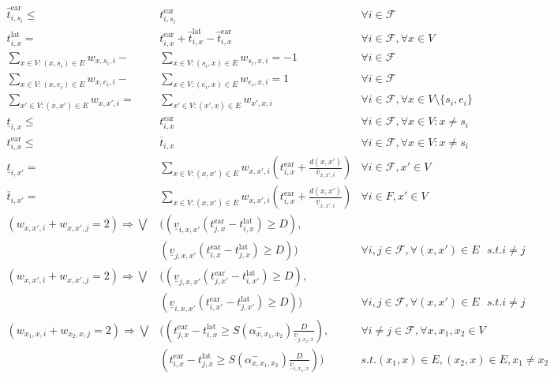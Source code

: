 \documentclass[../thesis.tex]{subfiles}
\begin{document}
\tiny
\begin{align}\label{eq:newModel}
  \hat t^\text{ear}_{i,s_i}\leq&  t^\text{ear}_{i,s_i} & \forall i \in \mathcal F\\
    t^\text{lat}_{i,x}=& t^\text{ear}_{i,x}+\hat t^\text{lat}_{i,x} -\hat t^\text{ear}_{i,x}
    & \forall i\in \mathcal F, \forall x \in V\\
    \sum_{x\in V:(x,s_i)\in E} w_{x,s_i,i} -& \sum_{x\in V:(s_i,x)\in E} w_{s_i,x,i} = -1 & \forall i \in \mathcal{F} \\
    \sum_{x\in V:(x,e_i)\in E} w_{x,e_{i},i} -& \sum_{x\in V:(e_i,x)\in E} w_{e_{i},x,i} = 1 & \forall i \in \mathcal{F} \\
    \sum_{x'\in V:(x,x')\in E} w_{x,x',i} =& \sum_{x'\in V:(x',x)\in E} w_{x',x,i} & \forall i \in \mathcal{F}, \forall x \in V\setminus\{s_{i}, e_{i}\}\\
    \underline t_{i,x} \leq& t^\text{ear}_{i,x}&\forall i \in \mathcal F, \forall x\in V: x\neq s_i\\
    t^\text{ear}_{i,x} \leq& \overline t_{i,x}&\forall i\in \mathcal F,\forall x\in V: x\neq s_i\\
    \underline t_{i,x'}=&\sum_{x\in V: (x,x')\in E} w_{x,x',i}\left(t^\text{ear}_{i,x}+\frac{d(x,x')}{\overline v_{x,x',i}}\right) &\forall i\in \mathcal F, x'\in V\\
    \overline t_{i,x'}=&\sum_{x\in V: (x,x')\in E} w_{x,x',i}\left(t^\text{ear}_{i,x}+\frac{d(x,x')}{\underline v_{x,x',i}}\right) &\forall i \in F, x'\in V\\
    (w_{x,x',i} + w_{x,x',j} = 2) \Rightarrow \bigvee&\Big(
    (\underline v_{i,x,x'}(t^\text{ear}_{j,x}-t^\text{lat}_{i,x})\geq D), \nonumber \\ &(\underline v_{j,x,x'}(t^\text{ear}_{i,x}-t^\text{lat}_{j,x})\geq D)\Big) & \forall i,j \in \mathcal{F}, \forall(x,x') \in E \text { }s.t. i\neq j\\
    (w_{x,x',i} + w_{x,x',j} = 2) \Rightarrow\bigvee&\Big((
    \underline v_{j,x,x'}(t^\text{ear}_{j,x'}-t^\text{lat}_{i,x'})\geq D), \nonumber\\&(\underline v_{i,x,x'}(t^\text{ear}_{i,x'}-t^\text{lat}_{j,x'})\geq D)\Big)
    & \forall i,j \in \mathcal{F}, \forall(x,x') \in E \text { }s.t. i\neq j\\
    (w_{x_{1},x,i} + w_{x_{2},x,j} = 2)
    \Rightarrow \bigvee 
    &\Bigg(
    \left(t^\text{ear}_{j,x} - t^\text{lat}_{i,x} \geq S(\alpha^-_{x,x_1,x_2}) \frac{D}{\underline{v}_{j,x_2,x}}\right)
    ,\nonumber &
    \forall i\neq j \in \mathcal{F}, \forall x,x_{1}, x_{2} \in V
    \\&
    \left(t^\text{ear}_{i,x} - t^\text{lat}_{j,x} \geq S(\alpha^-_{x,x_1,x_2}) \frac{D}{\underline{v}_{i,x_1,x}}\right)
    \Bigg)
     &s.t. (x_{1},x) \in E, (x_{2},x) \in E, x_1\neq x_2
\end{align}
\end{document}
